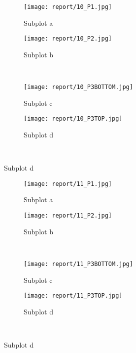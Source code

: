 \documentclass{article}%
\begin{document}
\begin{figure}[h!]%
\caption{11HAFTERSTARTFIRE}%
\centering%
\begin{subfigure}{0.45\textwidth}%
\texttt{[image:  report/10\_P1.jpg]}%
\caption{Subplot a}%
\end{subfigure}%
\begin{subfigure}{0.45\textwidth}%
\texttt{[image:  report/10\_P2.jpg]}%
\caption{Subplot b}%
\end{subfigure}%
\\%
\begin{subfigure}{0.45\textwidth}%
\texttt{[image:  report/10\_P3BOTTOM.jpg]}%
\caption{Subplot c}%
\end{subfigure}%
\begin{subfigure}{0.45\textwidth}%
\texttt{[image:  report/10\_P3TOP.jpg]}%
\caption{Subplot d}%
\end{subfigure}%
\\%
\end{figure}

%


\begin{figure}[h!]%
\caption{12HAFTERSTARTFIRE}%
\centering%
\begin{subfigure}{0.45\textwidth}%
\texttt{[image:  report/11\_P1.jpg]}%
\caption{Subplot a}%
\end{subfigure}%
\begin{subfigure}{0.45\textwidth}%
\texttt{[image:  report/11\_P2.jpg]}%
\caption{Subplot b}%
\end{subfigure}%
\\%
\begin{subfigure}{0.45\textwidth}%
\texttt{[image:  report/11\_P3BOTTOM.jpg]}%
\caption{Subplot c}%
\end{subfigure}%
\begin{subfigure}{0.45\textwidth}%
\texttt{[image:  report/11\_P3TOP.jpg]}%
\caption{Subplot d}%
\end{subfigure}%
\\%
\end{figure}

%

%
\end{document}
